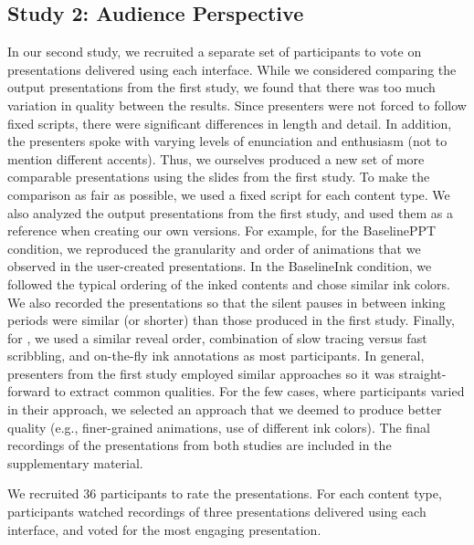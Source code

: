 \subsection{Study 2: Audience Perspective}
In our second study, we recruited a separate set of participants to vote on presentations delivered using each interface.
%
While we considered comparing the output presentations from the first study, we found that there was too much variation in quality between the results. Since presenters were not forced to follow fixed scripts, there were significant differences in length and detail. In addition, the presenters spoke with varying levels of enunciation and enthusiasm (not to mention different accents).
%
Thus, we ourselves produced a new set of more comparable presentations
using the slides from the first study.
%
To make the comparison as fair as possible, we used a fixed script for each content type.
We also analyzed the output presentations from the first study, and used them as a reference when creating our own versions. 
%
For example, for the BaselinePPT condition, we reproduced the granularity and order of animations that we observed in the user-created presentations.
In the BaselineInk condition, we followed the typical ordering of the inked contents and chose similar ink colors. We also recorded the presentations so that the silent pauses in between inking periods were similar (or shorter) than those produced in the first study. 
%
Finally, for \interface, we used a similar reveal order, combination of slow tracing versus fast scribbling, and on-the-fly ink annotations as most participants. 
%
In general, presenters from the first study employed similar approaches so it was straight-forward to extract common qualities. For the few cases, where participants varied in their approach, we selected an approach that we deemed to produce better quality (e.g., finer-grained animations, use of different ink colors). The final recordings of the presentations from both studies are included in the supplementary material. 

We recruited 36 participants to rate the presentations. For each content type, participants watched recordings of three presentations delivered using each interface, and voted for the most engaging presentation. 














